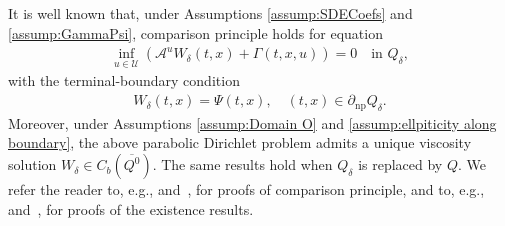 \documentclass[amscd,amssymb,11pt]{article}
\numberwithin{theorem}{section}
\numberwithin{equation}{section}
\begin{document}
It is well known that, under Assumptions \ref{assump:SDECoefs} and \ref{assump:GammaPsi}, comparison principle holds for
equation
\begin{align}\label{eq:HJBDelta}
\inf_{u\in\mathcal{U}}\left(\mathscr{A}^{u}W_{\delta}(t,x)+\Gamma(t,x,u)\right)=0\quad\text{in }Q_{\delta},
\end{align}
with the terminal-boundary condition
\begin{align*}%
W_{\delta}(t,x)=\Psi(t,x),\quad (t,x)\in\partial_{\text{np}}Q_{\delta}.
\end{align*}
Moreover, under Assumptions \ref{assump:Domain O} and \ref{assump:ellpiticity along boundary}, the above parabolic Dirichlet problem admits a unique viscosity solution $W_{\delta}\in C_{b}(\overline{Q^{0}})$. The same results hold when $Q_{\delta}$ is replaced by $Q$. We refer the reader to, e.g., \cite[Theorem 3]{BarlesImbert:2008} and~\cite[Theorem 3.1]{JakobsenKarlsen:2006}, for proofs of comparison principle, and to, e.g., \cite[Theorem 3.2]{Mou:2017} and~\cite[Theorem 5.1]{Mou:2018}, for proofs of the existence results.
\end{document}
